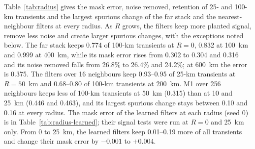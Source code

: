 \documentclass[preprint,12pt,authoryear]{elsarticle}
\begin{document}
Table~\ref{tab:radius} gives the mask error, noise removed, retention of 25- and 100-km transients and the largest spurious change of the far stack and the nearest-neighbour filters at every radius. As $R$ grows, the filters keep more planted signal, remove less noise and create larger spurious changes, with the exceptions noted below. The far stack keeps 0.774 of 100-km transients at $R = 0$, 0.832 at 100~km and 0.999 at 400~km, while its mask error rises from 0.302 to 0.304 and 0.316 and its noise removed falls from 26.8\% to 26.4\% and 24.2\%; at 600~km the error is 0.375. The filters over 16 neighbours keep 0.93--0.95 of 25-km transients at $R = 50$~km and 0.68--0.80 of 100-km transients at 200~km. M1 over 256 neighbours keeps less of 100-km transients at 50~km (0.315) than at 10 and 25~km (0.446 and 0.463), and its largest spurious change stays between 0.10 and 0.16 at every radius. The mask error of the learned filters at each radius (seed 0) is in Table~\ref{tab:radius-learned}; their signal tests were run at $R = 0$ and 25~km only. From 0 to 25~km, the learned filters keep 0.01--0.19 more of all transients and change their mask error by $-0.001$ to $+0.004$.
\end{document}
